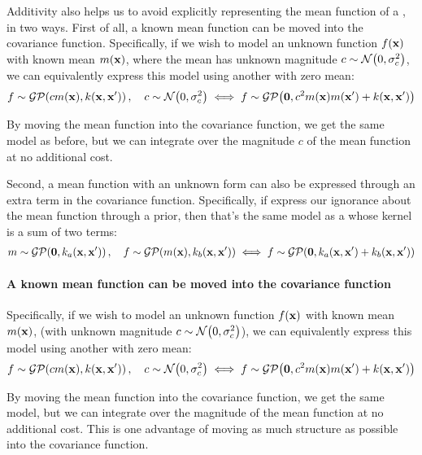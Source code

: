 Additivity also helps us to avoid explicitly representing the mean function of a \gp{}, in two ways.
First of all, a known mean function can be moved into the covariance function.
Specifically, if we wish to model an unknown function $f({\bf{x}})$ with known mean $m({\bf{x}})$, where the mean has unknown magnitude $c \sim \mathcal{N}\!\left(0,\sigma^2_c\right)$, we can equivalently express this model using another \gp{} with zero mean:
%
\begin{align}
f \sim \mathcal{GP}\!\left(c m({\bf{x}}),k({\bf{x}},{\bf{x}}')\right), \quad c \sim \mathcal{N}\!\left(0,\sigma^2_c\right)
\iff f \sim \mathcal{GP}\!\left( {\bf{0}} , c^2 m({\bf{x}}) m({\bf{x}}') + k({\bf{x}},{\bf{x}}')\right)
\end{align}

By moving the mean function into the covariance function, we get the same model as before, but we can integrate over the magnitude $c$ of the mean function at no additional cost.

Second, a mean function with an unknown form can also be expressed through an extra term in the covariance function.
Specifically, if express our ignorance about the mean function through a \gp{} prior, then that's the same model as a \gp{} whose kernel is a sum of two terms:
%
\begin{align}
m \sim \mathcal{GP}\!\left({\bf{0}},k_a({\bf{x}},{\bf{x}}')\right), \quad
f \sim \mathcal{GP}\!\left(m({\bf{x}}),k_b({\bf{x}},{\bf{x}}')\right)
\iff 
f \sim \mathcal{GP}\!\left({\bf{0}},k_a({\bf{x}},{\bf{x}}') + k_b({\bf{x}},{\bf{x}}')\right)
\end{align}



\paragraph{A known mean function can be moved into the covariance function}
Specifically, if we wish to model an unknown function $f({\bf{x}})$ with known mean $m({\bf{x}})$, (with unknown magnitude $c \sim \mathcal{N}\!\left(0,\sigma^2_c\right)$), we can equivalently express this model using another \gp{} with zero mean:
%
\begin{align}
f \sim \mathcal{GP}\!\left(c m({\bf{x}}),k({\bf{x}},{\bf{x}}')\right), \quad c \sim \mathcal{N}\!\left(0,\sigma^2_c\right)
\iff f \sim \mathcal{GP}\!\left( {\bf{0}} , c^2 m({\bf{x}}) m({\bf{x}}') + k({\bf{x}},{\bf{x}}')\right)
\end{align}

By moving the mean function into the covariance function, we get the same model, but we can integrate over the magnitude of the mean function at no additional cost.
This is one advantage of moving as much structure as possible into the covariance function.

